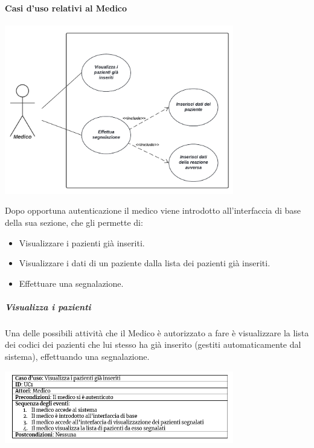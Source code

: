 \documentclass[11pt]{article}
\begin{document}
        \paragraph*{Casi d'uso relativi al Medico}
            \begin{center}
                \includegraphics[width=0.75\textwidth]{pictures/CasoDUsoMedico.png}
            \end{center}
        Dopo opportuna autenticazione il medico viene introdotto all'interfaccia di base della sua sezione, che gli permette di:
            \begin{itemize}
                \item Visualizzare i pazienti già inseriti.
                \item Visualizzare i dati di un paziente dalla lista dei pazienti già inseriti.
                \item Effettuare una segnalazione.
            \end{itemize}
            \subparagraph*{Visualizza i pazienti}
            Una delle possibili attività che il Medico è autorizzato a fare è visualizzare la lista dei codici dei pazienti che lui stesso ha già inserito (gestiti automaticamente dal sistema), effettuando una segnalazione.
                \begin{center}
                    \includegraphics[width=0.75\textwidth]{pictures/UC1.png}
            \end{center}
\end{document}
